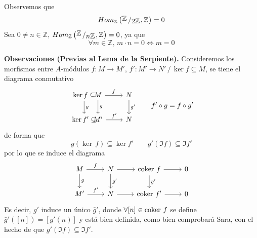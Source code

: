\begin{ejem}
    Observemos que 
    $$Hom_{\mathbb Z} \left( \modulo{\mathbb Z}{2\mathbb Z}, \mathbb Z \right) = 0$$
    Sea $0 \neq n \in \mathbb Z$, $Hom_{\mathbb Z} \left( \modulo{\mathbb Z}{n\mathbb Z}, \mathbb Z \right) = 0$, ya que $$\forall m \in \mathbb Z, \, m \cdot n = 0 \iff m=0$$
\end{ejem}
\noindent \textbf{Observaciones (Previas al Lema de la Serpiente).}
Consideremos los morfismos entre $A$-m\'odulos $f: M \longrightarrow M'$, $f': M' \longrightarrow N' \, / \, \ker  f \subseteq M $, se tiene el diagrama conmutativo
$$\bt \ker  f \arrow{d}{g} \subseteq &[-13mm] M \arrow{r}{f} \arrow{d}{g} & N \arrow{d}{g'} \\
      \ker  f' \subseteq &[-13mm] M' \arrow{r}{f'} & N 
\et \qquad f'\circ g = f\circ g'$$
de forma que 
$$g(\ker\, f) \subseteq \ker f' \qquad g'(\Im f) \subseteq \Im f'$$
por lo que se induce el diagrama
$$\bt M \arrow{r}{f} \arrow{d}{g} & N \arrow{d}{g'} \arrow{r} & \coker \, f \arrow{r} \arrow{d}{\bar g'} & 0\\
      M' \arrow{r}{f'} & N  \arrow{r} & \coker \, f' \arrow{r} & 0
\et $$
Es decir, $g'$ induce un \'unico $\bar g'$, donde $\forall [n] \in \operatorname{coker} \, f$ se define $\bar g'([n]) = [g'(n)]$ y est\'a bien definida, como bien comprobar\'a Sara, con el hecho de que  $g'(\Im f) \subseteq \Im f'$.
